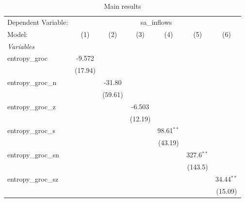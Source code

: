 
\begin{table}[htbp]
   \centering
   \caption{\label{tab:reg_sa_inflows_groc.tex} Main results}
   \begin{footnotesize}
      \begin{tabular}{lcccccc}
         \tabularnewline\midrule\midrule
         Dependent Variable: & \multicolumn{6}{c}{sa\_inflows}\\
         Model:              & (1)            & (2)            & (3)            & (4)            & (5)            & (6)\\
         \midrule \emph{Variables} &   &   &   &   &   &  \\
         entropy\_groc      & -9.572         &                &                &                &                &   \\
                             & (17.94)        &                &                &                &                &   \\
         entropy\_groc\_n  &                & -31.80         &                &                &                &   \\
                             &                & (59.61)        &                &                &                &   \\
         entropy\_groc\_z  &                &                & -6.503         &                &                &   \\
                             &                &                & (12.19)        &                &                &   \\
         entropy\_groc\_s  &                &                &                & 98.61$^{**}$   &                &   \\
                             &                &                &                & (43.19)        &                &   \\
         entropy\_groc\_sn &                &                &                &                & 327.6$^{**}$   &   \\
                             &                &                &                &                & (143.5)        &   \\
         entropy\_groc\_sz &                &                &                &                &                & 34.44$^{**}$\\
                             &                &                &                &                &                & (15.09)\\

\end{tabular}
\end{footnotesize}
\end{table}

